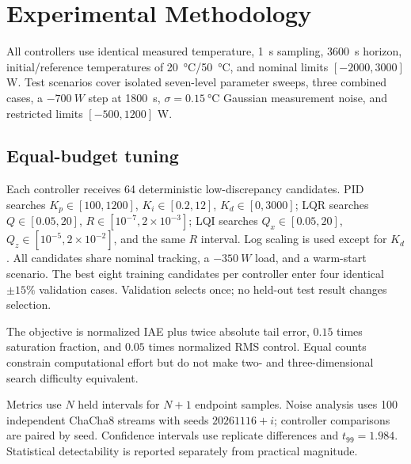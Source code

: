 \section{Experimental Methodology}\label{sec:methods}
All controllers use identical measured temperature, \SI{1}{s} sampling, \SI{3600}{s} horizon, initial/reference temperatures of \SI{20}{\celsius}/\SI{50}{\celsius}, and nominal limits $[-2000,3000]$ W. Test scenarios cover isolated seven-level parameter sweeps, three combined cases, a $-\SI{700}{W}$ step at \SI{1800}{s}, $\sigma=\SI{0.15}{\celsius}$ Gaussian measurement noise, and restricted limits $[-500,1200]$ W.

\subsection{Equal-budget tuning}
Each controller receives 64 deterministic low-discrepancy candidates. PID searches $K_p\in[100,1200]$, $K_i\in[0.2,12]$, $K_d\in[0,3000]$; LQR searches $Q\in[0.05,20]$, $R\in[10^{-7},2\times10^{-3}]$; LQI searches $Q_x\in[0.05,20]$, $Q_z\in[10^{-5},2\times10^{-2}]$, and the same $R$ interval. Log scaling is used except for $K_d$. All candidates share nominal tracking, a $-\SI{350}{W}$ load, and a warm-start scenario. The best eight training candidates per controller enter four identical $\pm15\%$ validation cases. Validation selects once; no held-out test result changes selection.

The objective is normalized IAE plus twice absolute tail error, $0.15$ times saturation fraction, and $0.05$ times normalized RMS control. Equal counts constrain computational effort but do not make two- and three-dimensional search difficulty equivalent.

Metrics use $N$ held intervals for $N+1$ endpoint samples. Noise analysis uses 100 independent ChaCha8 streams with seeds $20261116+i$; controller comparisons are paired by seed. Confidence intervals use replicate differences and $t_{99}=1.984$. Statistical detectability is reported separately from practical magnitude.

